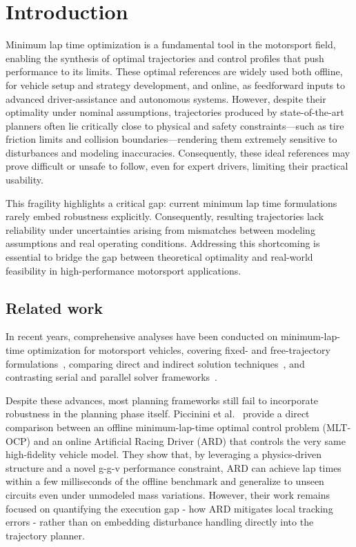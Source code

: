 \section{Introduction}
\label{sec:intro}

Minimum lap time optimization is a fundamental tool in the motorsport field, enabling the synthesis of optimal trajectories and control profiles that push performance to its limits. These optimal references are widely used both offline, for vehicle setup and strategy development, and online, as feedforward inputs to advanced driver-assistance and autonomous systems.
However, despite their optimality under nominal assumptions, trajectories produced by state-of-the-art planners often lie critically close to physical and safety constraints---such as tire friction limits and collision boundaries---rendering them extremely sensitive to disturbances and modeling inaccuracies. Consequently, these ideal references may prove difficult or unsafe to follow, even for expert drivers, limiting their practical usability.

This fragility highlights a critical gap: current minimum lap time formulations rarely embed robustness explicitly.
Consequently, resulting trajectories lack reliability under uncertainties arising from mismatches between modeling assumptions and real operating conditions.
Addressing this shortcoming is essential to bridge the gap between theoretical optimality and real-world feasibility in high-performance motorsport applications.

\subsection{Related work}
In recent years, comprehensive analyses have been conducted on minimum-lap-time optimization for motorsport vehicles, covering fixed- and free-trajectory formulations~\cite{Veneri:FreetrajectoryQuasisteadystateOptimalcontrol:2020, Lovato:ThreedimensionalFixedtrajectoryApproaches:2022, Lovato:ThreedimensionalFreetrajectoryQuasisteadystate:2022}, comparing direct and indirect solution techniques~\cite{DalBianco:ComparisonDirectIndirect:2019, Bertolazzi:DirectIndirectApproach:2025}, and contrasting serial and parallel solver frameworks~\cite{Biniewicz:QuasisteadystateMinimumLap:2024, Bartali:SchwarzDecompositionParallel:2024, Bartali:ConsensusbasedAlternatingDirection:2024}.

Despite these advances, most planning frameworks still fail to incorporate robustness in the planning phase itself. Piccinini et al.~\cite{Piccinini:HowOptimalMinimumtime:2024} provide a direct comparison between an offline minimum-lap-time optimal control problem (MLT-OCP) and an online Artificial Racing Driver (ARD) that controls the very same high-fidelity vehicle model. They show that, by leveraging a physics-driven structure and a novel g-g-v performance constraint, ARD can achieve lap times within a few milliseconds of the offline benchmark and generalize to unseen circuits even under unmodeled mass variations. However, their work remains focused on quantifying the execution gap - how ARD mitigates local tracking errors - rather than on embedding disturbance handling directly into the trajectory planner.

